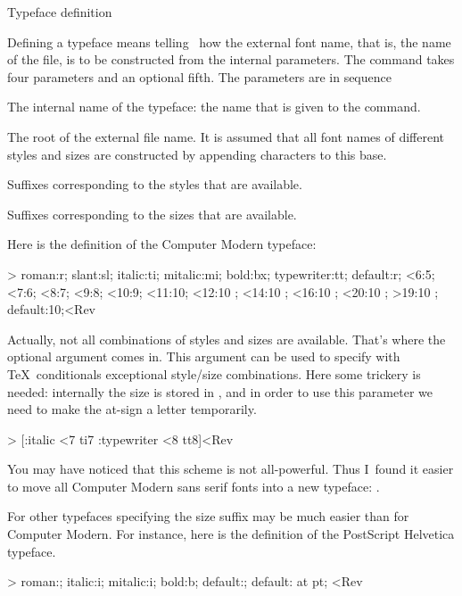 \SubSection Typeface definition

Defining a typeface means telling \Lollipop\ how the external font
name, that is, the name of the  file, is to be constructed from
the internal parameters. The command  takes four
parameters and an optional fifth. The parameters are in sequence
\Enumerate\item The internal name of the typeface: the name that is
given to the  command.
\item The root of the external file name. It is assumed that all
font names of different styles and sizes are constructed by appending
characters to this base.
\item Suffixes corresponding to the styles that are available.
\item Suffixes corresponding to the sizes that are available.
\>

Here is the definition of the Computer Modern typeface:

\Ver>
    {roman:r; slant:sl; italic:ti; mitalic:mi; bold:bx; typewriter:tt;
     default:r;}
    {<6:5; <7:6; <8:7; <9:8; <10:9; <11:10; 
     <12:10 \scaled\magstephalf;
     <14:10 \scaled{}; <16:10 \scaled{};
     <20:10 \scaled{}; >19:10 \scaled{};
     default:10;}<Rev

Actually, not all combinations of styles and sizes are available.
That's where the optional argument comes in. This argument can be
used to specify with \TeX\ conditionals exceptional style/size
combinations. Here some trickery is needed: internally the size is
stored in , and in order to use this parameter we need to
make the at-sign a letter temporarily.

\Ver>\makeatletter
{}
    [\ifStyle:italic \ifnum\Fsize<7 ti7\fi\fi
     \ifStyle:typewriter \ifnum\Fsize<8 tt8\fi\fi]<Rev

You may have noticed that this scheme is not all-powerful. Thus
I~found it easier to move all Computer Modern sans serif fonts into a
new typeface: .

For other typefaces specifying the size suffix may be much easier
than for Computer Modern. For instance, here is the definition of the
PostScript Helvetica typeface.

\Ver>\makeatletter
{}
    {roman:; italic:i; mitalic:i; bold:b; default:;}
    {default: at \Fsize pt;}
\makeatother<Rev


